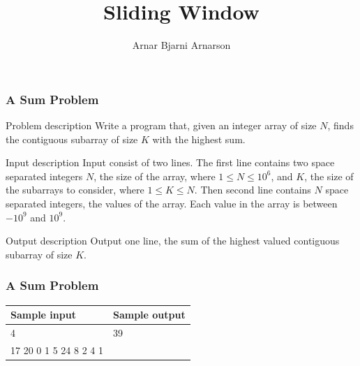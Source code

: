 \documentclass{beamer}
\title{Sliding Window}
\author{Arnar Bjarni Arnarson}
\institute{\href{http://ru.is/td}{School of Computer Science} \\[2pt] \href{http://ru.is}{Reykjavík University}}
\begin{document}
\maketitle

\begin{frame}[plain]
	\frametitle{A Sum Problem}
	\begin{block}{Problem description}
    	    Write a program that, given an integer array of size $N$, finds the
            contiguous subarray of size $K$ with the highest sum.
    \end{block}

    \vspace{10pt}
    
    \begin{block}{Input description}
            Input consist of two lines.
            The first line contains two space separated integers $N$, the size of the array, where $1 \leq N \leq 10^6$,
    and $K$, the size of the subarrays to consider, where $1 \leq K \leq N$.
            Then second line contains $N$ space separated integers, the values of the array.
            Each value in the array is between $-10^9$  and $10^9$.
    \end{block}

    \vspace{10pt}
    
    \begin{block}{Output description}
            Output one line, the sum of the highest valued contiguous subarray of size $K$.
    \end{block}
\end{frame}

\begin{frame}[plain]
	\frametitle{A Sum Problem}
	\begin{center}
		\begin{tabular}{|l|l|}
            \hline
            {\footnotesize Sample input} & {\footnotesize Sample output} \\
            \hline
            \ttfamily
            10 4 & 39 \\
            17 20 0 1 5 24 8 2 4 1 &  \\
            \hline
        \end{tabular}
    \end{center}
\end{frame}
\end{document}
